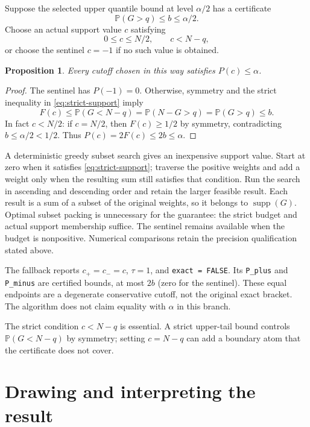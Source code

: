 \documentclass[11pt,letterpaper]{article}
\newtheorem{proposition}{Proposition}[section]
\DeclareMathOperator{\supp}{supp}
\newcommand{\Pbb}{\mathbb P}
\begin{document}
Suppose the selected upper quantile bound at level $\alpha/2$ has a certificate
\begin{equation}\label{eq:qcertificate}
\Pbb(G>q)\le b\le\alpha/2.
\end{equation}
Choose an actual support value $c$ satisfying
\begin{equation}\label{eq:strict-support}
0\le c\le N/2,\qquad c<N-q,
\end{equation}
or choose the sentinel $c=-1$ if no such value is obtained.

\begin{proposition}\label{prop:conservative}
Every cutoff chosen in this way satisfies $P(c)\le\alpha$.
\end{proposition}
\begin{proof}
The sentinel has $P(-1)=0$. Otherwise, symmetry and the strict inequality in
\eqref{eq:strict-support} imply
\[
F(c)\le\Pbb(G<N-q)=\Pbb(N-G>q)=\Pbb(G>q)\le b.
\]
In fact $c<N/2$: if $c=N/2$, then $F(c)\ge1/2$ by symmetry, contradicting
$b\le\alpha/2<1/2$. Thus $P(c)=2F(c)\le2b\le\alpha$.
\end{proof}

A deterministic greedy subset search gives an inexpensive support value.
Start at zero when it satisfies \eqref{eq:strict-support}; traverse the
positive weights and add a weight only when the resulting sum still
satisfies that condition. Run the search in ascending and descending order
and retain the larger feasible result. Each result is a sum of a subset of
the original weights, so it belongs to $\supp(G)$. Optimal subset packing
is unnecessary for the guarantee: the strict budget and actual support
membership suffice. The sentinel remains available when the budget is
nonpositive. Numerical comparisons retain the precision qualification
stated above.

The fallback reports $c_+=c_-=c$, $\tau=1$, and
\texttt{exact = FALSE}. Its \texttt{P\_plus} and \texttt{P\_minus} are
certified bounds, at most $2b$ (zero for the sentinel). These equal endpoints
are a degenerate conservative cutoff, not the original exact bracket.
The algorithm does not claim equality with $\alpha$ in this branch.

The strict condition $c<N-q$ is essential. A strict upper-tail bound controls
$\Pbb(G<N-q)$ by symmetry; setting $c=N-q$ can add a boundary atom that the
certificate does not cover.

\section{Drawing and interpreting the result}
\end{document}
